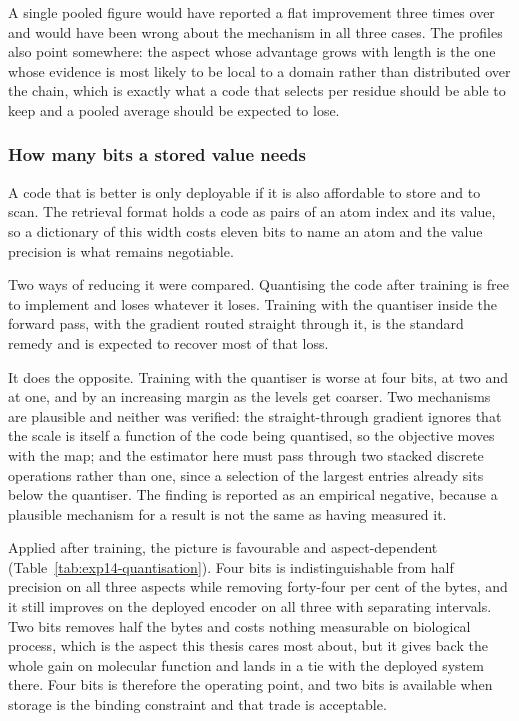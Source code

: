 A single pooled figure would have reported a flat improvement three times over and
would have been wrong about the mechanism in all three cases. The profiles also point
somewhere: the aspect whose advantage grows with length is the one whose evidence is
most likely to be local to a domain rather than distributed over the chain, which is
exactly what a code that selects per residue should be able to keep and a pooled
average should be expected to lose.

\subsubsection{How many bits a stored value needs}
\label{sec:exp14-bits}

A code that is better is only deployable if it is also affordable to store and to
scan. The retrieval format holds a code as pairs of an atom index and its value, so a
dictionary of this width costs eleven bits to name an atom and the value precision is
what remains negotiable.

Two ways of reducing it were compared. Quantising the code after training is free to
implement and loses whatever it loses. Training with the quantiser inside the forward
pass, with the gradient routed straight through it, is the standard remedy and is
expected to recover most of that loss.

It does the opposite. Training with the quantiser is worse at four bits, at two and
at one, and by an increasing margin as the levels get coarser. Two mechanisms are
plausible and neither was verified: the straight-through gradient ignores that the
scale is itself a function of the code being quantised, so the objective moves with
the map; and the estimator here must pass through two stacked discrete operations
rather than one, since a selection of the largest entries already sits below the
quantiser. The finding is reported as an empirical negative, because a plausible
mechanism for a result is not the same as having measured it.

Applied after training, the picture is favourable and aspect-dependent
(Table~\ref{tab:exp14-quantisation}). Four bits is indistinguishable from half
precision on all three aspects while removing forty-four per cent of the bytes, and
it still improves on the deployed encoder on all three with separating intervals. Two
bits removes half the bytes and costs nothing measurable on biological process, which
is the aspect this thesis cares most about, but it gives back the whole gain on
molecular function and lands in a tie with the deployed system there. Four bits is
therefore the operating point, and two bits is available when storage is the binding
constraint and that trade is acceptable.

